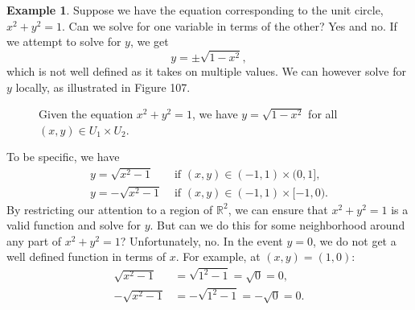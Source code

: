 \documentclass{article}
\newcommand{\R}{\mathbb{R}}
\theoremstyle{definition}
\newtheorem{example}{Example}[section]
\begin{document}
	\begin{example}
		Suppose we have the equation corresponding to the unit circle, $ x^2 + y^2 = 1 $. Can we solve for one variable in terms of the other? Yes and no. If we attempt to solve for $ y $, we get 
		$$ y=\pm \sqrt{1-x^2},$$ which is not well defined as it takes on multiple values. We can however solve for $ y $ locally, as illustrated in Figure 107. 
		\begin{figure}[h!]
			\centering
			\caption{Given the equation $ x^2+y^2=1 $, we have $ y=\sqrt{1-x^2} $ for all $ (x,y)\in U_1\times U_2 $. }
		\end{figure}
		To be specific, we have 
		\begin{align*}
			y=\sqrt{x^2-1}&\text{ if }(x,y)\in (-1,1)\times(0,1],\\
			y=-\sqrt{x^2-1}&\text{ if }(x,y)\in (-1,1)\times[-1,0).  
		\end{align*}
		By restricting our attention to a region of $ \R^2 $, we can ensure that $ x^2+y^2=1 $ is a valid function and solve for $ y $. But can we do this for some neighborhood around any part of $ x^2+y^2=1 $? Unfortunately, no. In the event $ y = 0 $, we do not get a well defined function in terms of $ x $. For example, at $ (x,y)=(1,0) $:
		\begin{align*}
			\sqrt{x^2-1} &= \sqrt{1^2 - 1}=\sqrt{0}=0,\\
			-\sqrt{x^2-1} &= -\sqrt{1^2 - 1}=-\sqrt{0}=0.
		\end{align*}	 
		

\end{example}
\end{document}
